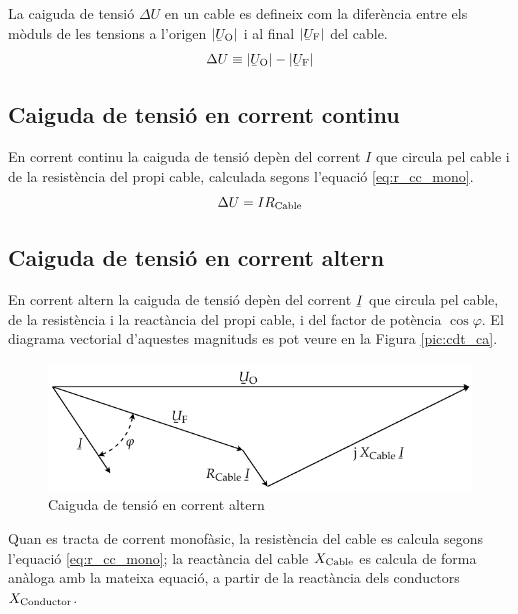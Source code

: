 La caiguda de tensi\'{o} $\Delta U$ en un cable es defineix com la difer\`{e}ncia entre els m\`{o}duls de les tensions a l'origen $|{\cmplx{U}\ped{O}}|$ i al final $|\cmplx{U}\ped{F}|$ del cable.
\begin{equation}
   \Delta U \equiv |\cmplx{U}\ped{O}| - |\cmplx{U}\ped{F}|
\end{equation}

\subsection{Caiguda de tensi\'{o} en corrent continu}

En corrent continu la caiguda de tensi\'{o} dep\`{e}n del corrent $I$ que circula pel cable i de la  resist\`{e}ncia del propi cable, calculada segons l'equaci\'{o} \eqref{eq:r_cc_mono}.
\begin{equation}
   \Delta U = I R_\mathrm{Cable}
\end{equation}

\subsection{Caiguda de tensi\'{o} en corrent altern}

En corrent altern la caiguda de tensi\'{o}
dep\`{e}n del  corrent $\cmplx{I}$ que circula pel cable, de la
resist\`{e}ncia i la react\`{a}ncia del propi cable, i del factor de
pot\`{e}ncia $\cos \varphi$. El diagrama vectorial d'aquestes magnituds
es pot veure en la Figura \vref{pic:cdt_ca}.
\begin{figure}[htb]
   \centering
   \includegraphics{Imatges/Cap-Cables-Caiguda-Tensio.pdf}
   \caption{Caiguda de tensi\'{o} en corrent altern}\label{pic:cdt_ca}
\end{figure}

Quan es tracta de corrent monof\`{a}sic, la resist\`{e}ncia del cable es calcula segons l'equaci\'{o}
\eqref{eq:r_cc_mono}; la react\`{a}ncia del cable $X_\mathrm{Cable}$ es calcula de forma an\`{a}loga
amb la mateixa equaci\'{o}, a partir de la react\`{a}ncia dels conductors $X_\mathrm{Conductor}$.

